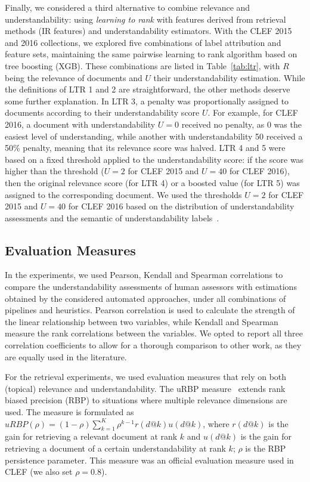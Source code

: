 \documentclass[10pt,a4paper]{article}
\begin{document}
Finally, we considered a third alternative to combine relevance and understandability: using \textit{learning to rank} with features derived from retrieval methods (IR features) and understandability estimators.
With the CLEF 2015 and 2016 collections, we explored five combinations of label attribution and feature sets, maintaining the same pairwise learning to rank algorithm based on tree boosting (XGB).
These combinations are listed in Table~\ref{tab:ltr}, with $R$ being the relevance of documents and $U$ their understandability estimation. While the definitions of LTR 1 and 2 are straightforward, the other methods deserve some further explanation. In LTR 3, a penalty was proportionally assigned to documents according to their understandability score $U$. For example, for CLEF 2016, a document with understandability $U=0$ received no penalty, as 0 was the easiest level of understanding, while another with understandability 50 received a 50\% penalty, meaning that its relevance score was halved. LTR 4 and 5 were based on a fixed threshold applied to the understandability score: if the score was higher than the threshold ($U=2$ for CLEF 2015 and $U=40$ for CLEF 2016), then the original relevance score (for LTR 4) or a boosted value (for LTR 5) was assigned to the corresponding document. We used the thresholds $U=2$ for CLEF 2015 and $U=40$ for CLEF 2016 based on the distribution of
understandability assessments and the semantic of understandability labels~\cite{clef15,clef16}.


\subsection*{Evaluation Measures}

In the experiments, we used Pearson, Kendall and Spearman correlations to compare the understandability assessments of human assessors with estimations obtained by the considered automated approaches, under all combinations of pipelines and heuristics. Pearson correlation is used to calculate the strength of the linear relationship between two variables, while Kendall and Spearman measure the rank correlations between the variables. We opted to report all three correlation coefficients to allow for a thorough comparison to other work, as they are equally used in the literature. 

For the retrieval experiments, we used evaluation measures that rely on both (topical) relevance and understandability. 
The uRBP measure~\cite{zuccon2016understandability} extends rank biased precision (RBP) to situations where multiple relevance dimensions are used. The measure is formulated as $uRBP(\rho) = (1 - \rho) \sum_{k=1}^{K} \rho^{k-1} r(d@k) u(d@k)$, where $r(d@k)$ is the gain for retrieving a relevant document at rank $k$ and $u(d@k)$ is the gain for retrieving a document of a certain understandability at rank $k$; $\rho$ is the RBP persistence parameter. This measure was an official evaluation measure used in CLEF (we also set $\rho=0.8$). 
\end{document}
